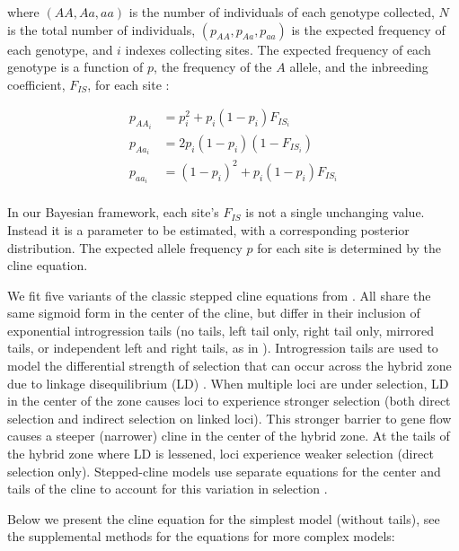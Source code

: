 \documentclass[]{article}
\begin{document}
where \((AA, Aa, aa)\) is the number of individuals of each genotype
collected, \(N\) is the total number of individuals,
\((p_{AA}, p_{Aa}, p_{aa})\) is the expected frequency of each genotype,
and \(i\) indexes collecting sites. The expected frequency of each
genotype is a function of \(p\), the frequency of the \(A\) allele, and
the inbreeding coefficient, \(F_{IS}\), for each site
\citep{Hartl:1997vl}:

\begin{equation}
\label{eq:genofreq}
\begin{split}
p_{{AA}_{i}} &= p_{i}^{2} + p_{i}(1-p_{i})F_{{IS}_{i}}\\ 
p_{{Aa}_{i}} &= 2p_{i}(1-p_{i})(1-F_{{IS}_{i}})\\
p_{{aa}_{i}} &= (1-p_{i})^{2} + p_{i}(1-p_{i})F_{{IS}_{i}}\\
\end{split}
\end{equation}

In our Bayesian framework, each site's \(F_{IS}\) is not a single
unchanging value. Instead it is a parameter to be estimated, with a
corresponding posterior distribution. The expected allele frequency
\(p\) for each site is determined by the cline equation.

We fit five variants of the classic stepped cline equations from
\citet{Szymura:1986cm}. All share the same sigmoid form in the center of
the cline, but differ in their inclusion of exponential introgression
tails (no tails, left tail only, right tail only, mirrored tails, or
independent left and right tails, as in \citealp{Derryberry:2014jw}).
Introgression tails are used to model the differential strength of
selection that can occur across the hybrid zone due to linkage
disequilibrium (LD) \citep{Barton:1983cu}. When multiple loci are under
selection, LD in the center of the zone causes loci to experience
stronger selection (both direct selection and indirect selection on
linked loci). This stronger barrier to gene flow causes a steeper
(narrower) cline in the center of the hybrid zone. At the tails of the
hybrid zone where LD is lessened, loci experience weaker selection
(direct selection only). Stepped-cline models use separate equations for
the center and tails of the cline to account for this variation in
selection \citep{Szymura:1986cm}.

Below we present the cline equation for the simplest model (without
tails), see the supplemental methods for the equations for more complex
models:
\end{document}
